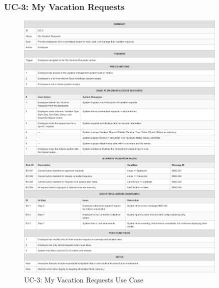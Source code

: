 \documentclass[12pt,a4paper]{article}
\begin{document}
\subsubsection{UC-3: My Vacation Requests}
\begin{figure}[H]
\centering
\includegraphics[width=0.9\textwidth]{Use-Cases/UC-3-My-Vacation-Requests/UC-3-My-Vacation-Requests-1.png}
\caption{UC-3: My Vacation Requests Use Case}
\label{fig:uc3}
\end{figure}
\end{document}
